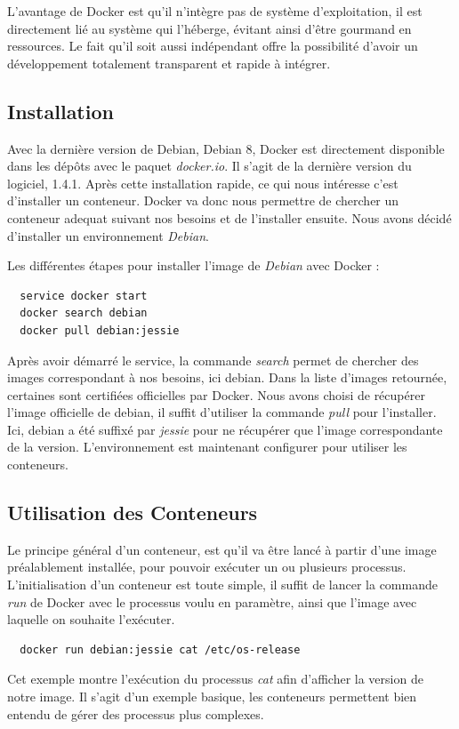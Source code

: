 \documentclass[12pt,a4paper]{article}
\begin{document}
L'avantage de Docker est qu'il n'intègre pas de système d'exploitation, il est directement lié au système qui l'héberge, évitant ainsi d'être gourmand en ressources. Le fait qu'il soit aussi indépendant offre la possibilité d'avoir un développement totalement transparent et rapide à intégrer. 

\subsection{Installation}
Avec la dernière version de Debian, Debian 8, Docker est directement disponible dans les dépôts avec le paquet \textit{docker.io}. Il s'agit de la dernière version du logiciel, 1.4.1. Après cette installation rapide, ce qui nous intéresse c'est d'installer un conteneur. Docker va donc nous permettre de chercher un conteneur adequat suivant nos besoins et de l'installer ensuite. Nous avons décidé d'installer un environnement \textit{Debian}.

Les différentes étapes pour installer l'image de \textit{Debian} avec Docker :
\begin{lstlisting}
  service docker start
  docker search debian
  docker pull debian:jessie
\end{lstlisting}

Après avoir démarré le service, la commande \textit{search} permet de chercher des images correspondant à nos besoins, ici debian. Dans la liste d'images retournée, certaines sont certifiées officielles par Docker. Nous avons choisi de récupérer l'image officielle de debian, il suffit d'utiliser la commande \textit{pull} pour l'installer. Ici, debian a été suffixé par \textit{jessie} pour ne récupérer que l'image correspondante de la version. L'environnement est maintenant configurer pour utiliser les conteneurs.

\subsection{Utilisation des Conteneurs}

Le principe général d'un conteneur, est qu'il va être lancé à partir d'une image préalablement installée, pour pouvoir exécuter un ou plusieurs processus. L'initialisation d'un conteneur est toute simple, il suffit de lancer la commande \textit{run} de Docker avec le processus voulu en paramètre, ainsi que l'image avec laquelle on souhaite l'exécuter. 

\begin{lstlisting}
  docker run debian:jessie cat /etc/os-release
\end{lstlisting}
Cet exemple montre l'exécution du processus \textit{cat} afin d'afficher la version de notre image. Il s'agit d'un exemple basique, les conteneurs permettent bien entendu de gérer des processus plus complexes.
\end{document}

